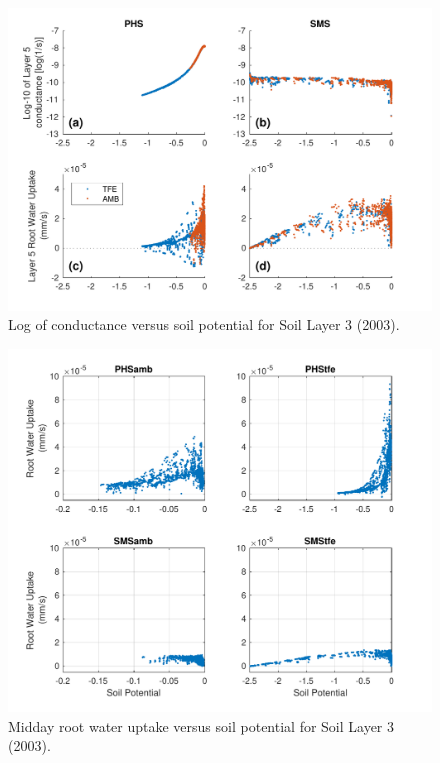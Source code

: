 \documentclass[draft,linenumbers]{agujournal}
\begin{document}
  
  \begin{figure}[h]
     \centering
     \includegraphics[width=30pc]{../figs3/suppcond.pdf}
     \caption{Log of conductance versus soil potential for Soil Layer 3 (2003).}
     \label{supp:cond2}
  \end{figure}
  \clearpage
  
    \begin{figure}[h]
     \centering
     \includegraphics[width=30pc]{../figs3/supprwu.pdf}
     \caption{Midday root water uptake versus soil potential for Soil Layer 3 (2003).}
     \label{supp:rwu}
  \end{figure}
  \clearpage
\end{document}

